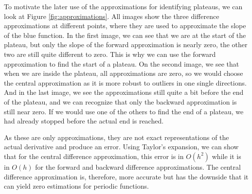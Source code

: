 To motivate the later use of the approximations for identifying plateaus, we can look at Figure \ref{fig:approximations}. All images show the three difference approximations at different points, where they are used to approximate the slope of the blue function. In the first image, we can see that we are at the start of the plateau, but only the slope of the forward approximation is nearly zero, the other two are still quite different to zero. This is why we can use the forward approximation to find the start of a plateau. On the second image, we see that when we are inside the plateau, all approximations are zero, so we would choose the central approximation as it is more robust to outliers in one single directions. And in the last image, we see the approximations still quite a bit before the end of the plateau, and we can recognize that only the backward approximation is still near zero. If we would use one of the others to find the end of a plateau, we had already stopped before the actual end is reached.

As these are only approximations, they are not exact representations of the actual derivative and produce an error. Using Taylor's expansion, we can show that for the central difference approximation, this error is in $O(h^2)$ while it is in $O(h)$ for the forward and backward difference approximations. The central difference approximation is, therefore, more accurate but has the downside that it can yield zero estimations for periodic functions.

